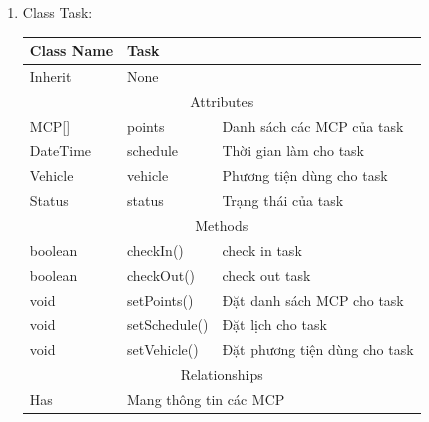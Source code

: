 \begin{enumerate}
        \item Class Task:
        \begin{table}[htp]
            \begin{tabular}{|lll|}
                \hline
                \multicolumn{1}{|l|}{Class Name} & \multicolumn{2}{l|}{Task}                                          \\ \hline
                \multicolumn{1}{|l|}{Inherit}    & \multicolumn{2}{l|}{None}                                          \\ \hline
                \multicolumn{3}{|c|}{\cellcolor[HTML]{FFFFC7}Attributes}                                              \\ \hline
                \multicolumn{1}{|l|}{MCP{[}{]}}  & \multicolumn{1}{l|}{points}        & Danh sách các MCP của task    \\ \hline
                \multicolumn{1}{|l|}{DateTime}   & \multicolumn{1}{l|}{schedule}      & Thời gian làm cho task        \\ \hline
                \multicolumn{1}{|l|}{Vehicle}    & \multicolumn{1}{l|}{vehicle}       & Phương tiện dùng cho task     \\ \hline
                \multicolumn{1}{|l|}{Status}     & \multicolumn{1}{l|}{status}        & Trạng thái của task           \\ \hline
                \multicolumn{3}{|c|}{\cellcolor[HTML]{FFFFC7}Methods}                                                 \\ \hline
                \multicolumn{1}{|l|}{boolean}    & \multicolumn{1}{l|}{checkIn()}     & check in task                 \\ \hline
                \multicolumn{1}{|l|}{boolean}    & \multicolumn{1}{l|}{checkOut()}    & check out task                \\ \hline
                \multicolumn{1}{|l|}{void}       & \multicolumn{1}{l|}{setPoints()}   & Đặt danh sách MCP cho task    \\ \hline
                \multicolumn{1}{|l|}{void}       & \multicolumn{1}{l|}{setSchedule()} & Đặt lịch cho task             \\ \hline
                \multicolumn{1}{|l|}{void}       & \multicolumn{1}{l|}{setVehicle()}  & Đặt phương tiện dùng cho task \\ \hline
                \multicolumn{3}{|c|}{\cellcolor[HTML]{FFFFC7}Relationships}                                           \\ \hline
                \multicolumn{1}{|l|}{Has}        & \multicolumn{2}{l|}{Mang thông tin các MCP}                        \\ \hline
            \end{tabular}
        \end{table}
           

\end{enumerate}
